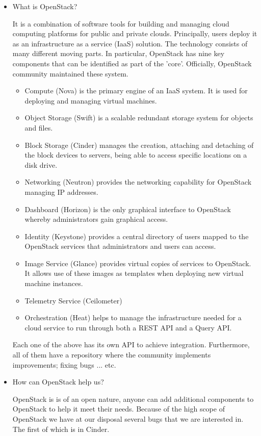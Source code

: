 \documentclass[a4paper]{article}
\begin{document}
\begin{itemize}
\item What is OpenStack?

It is a combination of software tools for building and managing cloud computing platforms for public and private clouds. Principally, users deploy it as an infrastructure as a service (IaaS) solution. The technology consists of many different moving parts. In particular, OpenStack has nine key components that can be identified as part of the 'core'. Officially, OpenStack community maintained these system. 

\begin{itemize}
    \item Compute (Nova) is the primary engine of an IaaS system. It is used for deploying and managing virtual machines.
    \item Object Storage (Swift) is a scalable redundant storage system for objects and files.
    \item Block Storage (Cinder) manages the creation, attaching and detaching of the block devices to servers, being able to access specific locations on a disk drive.
    \item Networking (Neutron) provides the networking capability for OpenStack managing IP addresses.
    \item Dashboard (Horizon) is the only graphical interface to OpenStack whereby administrators gain graphical access.
    \item Identity (Keystone) provides a central directory of users mapped to the OpenStack services that administrators and users can access.
    \item  Image Service (Glance) provides virtual copies of services to OpenStack. It allows use of these images as templates when deploying new virtual machine instances. 
    \item Telemetry Service (Ceilometer) 
    \item Orchestration (Heat) helps to manage the infrastructure needed for a cloud service to run through both a REST API and a Query API.
\end{itemize}

Each one of the above has its own API to achieve integration. Furthermore, all of them have a repository where the community implements improvements; fixing bugs ... etc.

\item How can OpenStack help us?

OpenStack is is of an open nature, anyone can add additional components to OpenStack to help it  meet their needs. Because of the high scope of OpenStack we have at our disposal several bugs that we are interested in. The first of which is in Cinder. 


\end{itemize}
\end{document}

